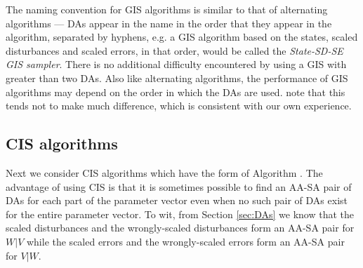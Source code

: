 \documentclass[12pt]{article}
\begin{document}

The naming convention for GIS algorithms is similar to that of alternating algorithms --- DAs appear in the name in the order that they appear in the algorithm, separated by hyphens, e.g. a GIS algorithm based on the states, scaled disturbances and scaled errors, in that order, would be called the {\it State-SD-SE GIS sampler}. There is no additional difficulty encountered by using a GIS with greater than two DAs. Also like alternating algorithms, the performance of GIS algorithms may depend on the order in which the DAs are used. \citet{yu2011center} note that this tends not to make much difference, which is consistent with our own experience.

\subsection{CIS algorithms}\label{sec:Algs:CIS}
Next we consider CIS algorithms which have the form of Algorithm . The advantage of using CIS is that it is sometimes possible to find an AA-SA pair of DAs for each part of the parameter vector even when no such pair of DAs exist for the entire parameter vector. To wit, from Section \ref{sec:DAs} we know that the scaled disturbances and the wrongly-scaled disturbances form an AA-SA pair for $W|V$ while the scaled errors and the wrongly-scaled errors form an AA-SA pair for $V|W$.
\end{document}
